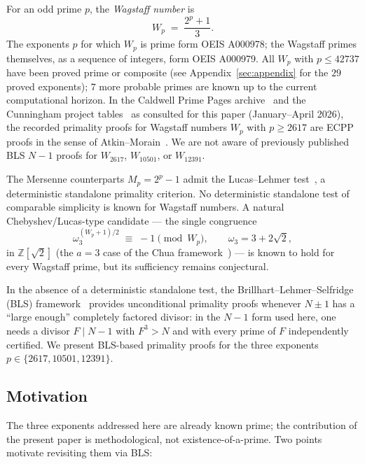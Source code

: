 \documentclass[11pt,a4paper]{amsart}
\theoremstyle{plain}
\theoremstyle{definition}
\newcommand{\Z}{\mathbb{Z}}
\newcommand{\wom}{\omega_3}
\newcommand{\Wp}{W_p}
\newcommand{\sqrttwo}{\sqrt{2}}
\begin{document}
For an odd prime $p$, the \emph{Wagstaff number} is
\begin{equation*}
  W_p \;=\; \frac{2^p + 1}{3}.
\end{equation*}
The exponents $p$ for which $W_p$ is prime form OEIS A000978; the
Wagstaff primes themselves, as a sequence of integers, form OEIS
A000979. All $W_p$ with $p \leq 42737$ have been proved prime or
composite (see Appendix~\ref{sec:appendix} for the $29$ proved
exponents); $7$ more probable primes are known up to the current
computational horizon. In the Caldwell Prime Pages
archive~\cite{Caldwell} and the Cunningham project
tables~\cite{Cunningham} as consulted for this paper (January--April
2026), the recorded primality proofs for Wagstaff numbers $W_p$ with
$p \geq 2617$ are ECPP proofs in the sense of
Atkin--Morain~\cite{AtkinMorain}. We are not aware of previously
published BLS $N - 1$ proofs for $W_{2617}$, $W_{10501}$, or
$W_{12391}$.

The Mersenne counterparts $M_p = 2^p - 1$ admit the Lucas--Lehmer
test~\cite{Lehmer}, a deterministic standalone primality criterion. No
deterministic standalone test of comparable simplicity is known for
Wagstaff numbers. A natural Chebyshev/Lucas-type candidate --- the
single congruence
\begin{equation*}
  \wom^{(W_p + 1)/2} \;\equiv\; -1 \pmod{\Wp}, \qquad \wom = 3 + 2\sqrttwo,
\end{equation*}
in $\Z[\sqrttwo]$ (the $a = 3$ case of the Chua
framework~\cite{Chua}) --- is known to hold for every Wagstaff prime,
but its sufficiency remains conjectural.

In the absence of a deterministic standalone test, the
Brillhart--Lehmer--Selfridge (BLS) framework~\cite{BLS75} provides
unconditional primality proofs whenever $N \pm 1$ has a ``large
enough'' completely factored divisor: in the $N - 1$ form used here,
one needs a divisor $F \mid N - 1$ with $F^3 > N$ and with every
prime of $F$ independently certified. We present BLS-based primality
proofs for the three exponents $p \in \{2617, 10501, 12391\}$.

\subsection{Motivation}

The three exponents addressed here are already known prime; the
contribution of the present paper is methodological, not
existence-of-a-prime. Two points motivate revisiting them via BLS:
\end{document}
